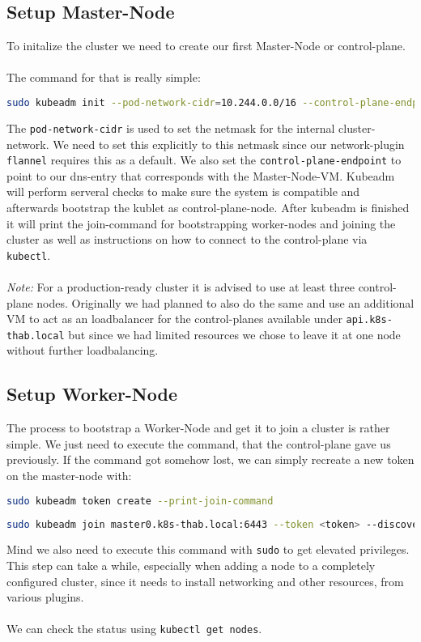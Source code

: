 \subsection{Setup Master-Node}
To initalize the cluster we need to create our first Master-Node or control-plane.\\\\The command for that is really simple:
\begin{lstlisting}[language=bash,caption=Initialize Controle-Plane] 
sudo kubeadm init --pod-network-cidr=10.244.0.0/16 --control-plane-endpoint master0.k8s-thab.local
\end{lstlisting}
The \texttt{pod-network-cidr} is used to set the netmask for the internal cluster-network. We need to set this explicitly to this netmask since our network-plugin \texttt{flannel} requires this as a default.
We also set the \texttt{control-plane-endpoint} to point to our dns-entry that corresponds with the Master-Node-VM.
Kubeadm will perform serveral checks to make sure the system is compatible and afterwards bootstrap the kublet as control-plane-node.
After kubeadm is finished it will print the join-command for bootstrapping worker-nodes and joining the cluster as well as instructions on how to connect to the control-plane via \texttt{kubectl}.\\\\\textit{Note:} For a production-ready cluster it is advised to use at least three control-plane nodes. Originally we had planned to also do the same and use an additional VM to act as an loadbalancer for the control-planes available under \texttt{api.k8s-thab.local} but since we had limited resources we chose to leave it at one node without further loadbalancing.

\subsection{Setup Worker-Node}
The process to bootstrap a Worker-Node and get it to join a cluster is rather simple. We just need to execute the command, that the control-plane gave us previously. If the command got somehow lost, we can simply recreate a new token on the master-node with:
\begin{lstlisting}[language=bash,caption=Get new Join-Token for Worker-Node] 
sudo kubeadm token create --print-join-command
\end{lstlisting}
\begin{lstlisting}[language=bash,caption=Example Join-Command] 
sudo kubeadm join master0.k8s-thab.local:6443 --token <token> --discovery-token-ca-cert-hash <sha256-hash>
\end{lstlisting}
Mind we also need to execute this command with \texttt{sudo} to get elevated privileges. This step can take a while, especially when adding a node to a completely configured cluster, since it needs to install networking and other resources, from various plugins.\\\\We can check the status using \texttt{kubectl get nodes}.

